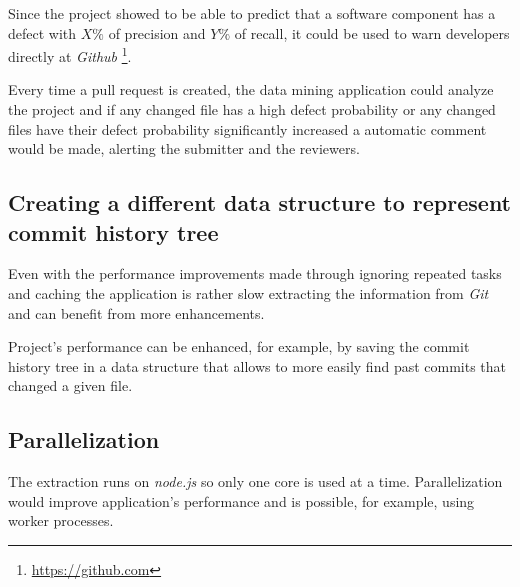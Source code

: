 Since the project showed to be able to predict that a software component has a defect with $X\%$ of precision and $Y\%$ of recall, it could be used to warn developers directly at \emph{Github} \footnote{\url{https://github.com}}.

Every time a pull request is created, the data mining application could analyze the project and if any changed file has a high defect probability or any changed files have their defect probability significantly increased a automatic comment would be made, alerting the submitter and the reviewers.

\subsection{Creating a different data structure to represent commit history tree}

Even with the performance improvements made through ignoring repeated tasks and caching the application is rather slow extracting the information from \emph{Git} and can benefit from more enhancements.

Project's performance can be enhanced, for example, by saving the commit history tree in a data structure that allows to more easily find past commits that changed a given file.

\subsection{Parallelization}

The extraction runs on \emph{node.js} so only one core is used at a time. Parallelization would improve application's performance and is possible, for example, using worker processes.